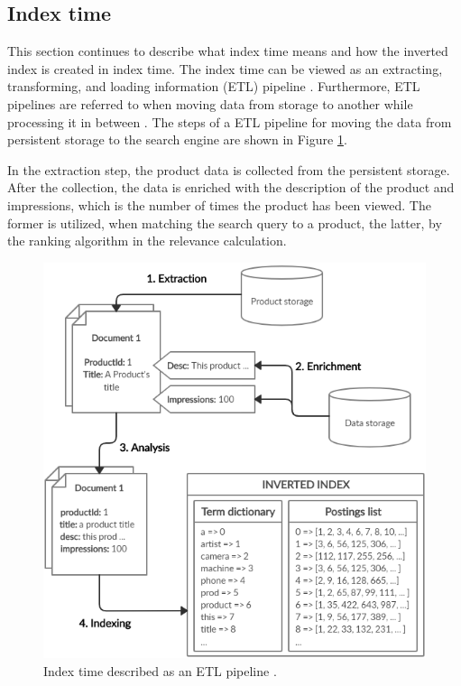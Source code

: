 
\subsection{Index time}
\label{ss:indexTime}

This section continues to describe what index time means and how the inverted index is 
created in index time.
The index time can be viewed as an extracting, transforming, and loading information (ETL) pipeline \cite{relevantSearch}.
Furthermore, ETL pipelines are referred to when moving data from storage to another while processing it in between \cite{relevantSearch}.
The steps of a ETL pipeline for moving the data from persistent storage to the search engine are shown in Figure \ref{fig:etlPipe}.

In the extraction step, the product data is collected from the persistent storage.
After the collection, the data is enriched with the description of the product and impressions, 
which is the number of times the product has been viewed. 
The former is utilized, when matching the search query to a product, the latter, by the ranking algorithm in the relevance calculation.

\begin{figure}
    \centering
    \includegraphics[width=\textwidth]{img/etl-pipeline.png}
    \caption{Index time described as an ETL pipeline \cite{relevantSearch}.}
    \label{fig:etlPipe}
\end{figure}

